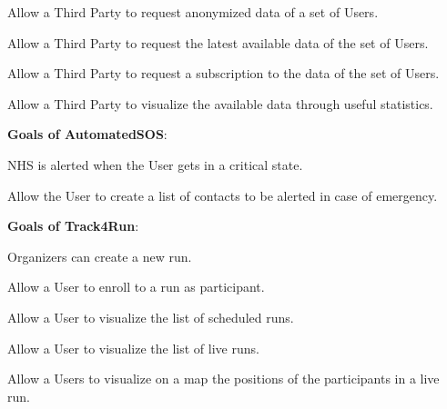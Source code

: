 \begin{goalList}
\begin{enumerate}[label={[}G3.\arabic*{]}]
    \item \label{goal:parties4}Allow a Third Party to request anonymized data of a set of Users.
    
     \begin{enumerate}[label={[}G3.5.\arabic*{]}]
        \item \label{goal:parties5}Allow a Third Party to request the latest available data of the set of Users.
        \item \label{goal:parties6}Allow a Third Party to request a subscription to the data of the set of Users.
    \end{enumerate}
    
    \item \label{goal:parties7}Allow a Third Party to visualize the available data through useful statistics.
    \newline
    
\end{enumerate}

\textbf{Goals of AutomatedSOS}:
\begin{enumerate}[label={[}G4.\arabic*{]}]

\item \label{goal:sos1}NHS is alerted when the User gets in a critical state.
\item \label{goal:sos2}Allow the User to create a list of contacts to be alerted in case of emergency.
    
\end{enumerate}
\newpage

\textbf{Goals of Track4Run}:
\begin{enumerate}[label={[}G5.\arabic*{]}]

    \item \label{goal:run1}Organizers can create a new run.
    \item \label{goal:run2}Allow a User to enroll to a run as participant.
    \item \label{goal:run3}Allow a User to visualize the list of scheduled runs.
     \item\label{goal:run4}Allow a User to visualize the list of live runs.
    \item \label{goal:run5}Allow a Users to visualize on a map the positions of the participants in a live run.
   
    
\end{enumerate}
\end{goalList}

